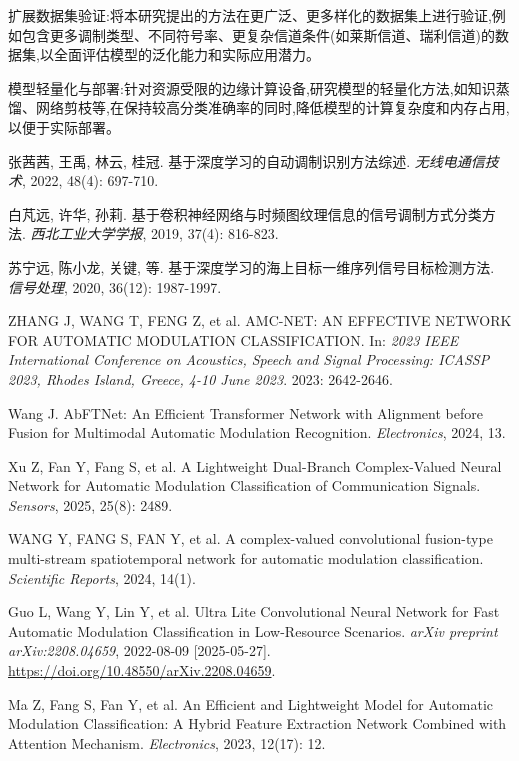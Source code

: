 \documentclass{article}
\begin{document}
\begin{CJK}{UTF8}{gbsn}
扩展数据集验证:将本研究提出的方法在更广泛、更多样化的数据集上进行验证,例如包含更多调制类型、不同符号率、更复杂信道条件(如莱斯信道、瑞利信道)的数据集,以全面评估模型的泛化能力和实际应用潜力。

模型轻量化与部署:针对资源受限的边缘计算设备,研究模型的轻量化方法,如知识蒸馏、网络剪枝等,在保持较高分类准确率的同时,降低模型的计算复杂度和内存占用,以便于实际部署。

\newpage

\begin{thebibliography}{99}

 张茜茜, 王禹, 林云, 桂冠. 基于深度学习的自动调制识别方法综述. \textit{无线电通信技术}, 2022, 48(4): 697-710.

 白芃远, 许华, 孙莉. 基于卷积神经网络与时频图纹理信息的信号调制方式分类方法. \textit{西北工业大学学报}, 2019, 37(4): 816-823.

 苏宁远, 陈小龙, 关键, 等. 基于深度学习的海上目标一维序列信号目标检测方法. \textit{信号处理}, 2020, 36(12): 1987-1997.

 ZHANG J, WANG T, FENG Z, et al. AMC-NET: AN EFFECTIVE NETWORK FOR AUTOMATIC MODULATION CLASSIFICATION. In: \textit{2023 IEEE International Conference on Acoustics, Speech and Signal Processing: ICASSP 2023, Rhodes Island, Greece, 4-10 June 2023}. 2023: 2642-2646.

 Wang J. AbFTNet: An Efficient Transformer Network with Alignment before Fusion for Multimodal Automatic Modulation Recognition. \textit{Electronics}, 2024, 13.

 Xu Z, Fan Y, Fang S, et al. A Lightweight Dual-Branch Complex-Valued Neural Network for Automatic Modulation Classification of Communication Signals. \textit{Sensors}, 2025, 25(8): 2489.

 WANG Y, FANG S, FAN Y, et al. A complex-valued convolutional fusion-type multi-stream spatiotemporal network for automatic modulation classification. \textit{Scientific Reports}, 2024, 14(1).

 Guo L, Wang Y, Lin Y, et al. Ultra Lite Convolutional Neural Network for Fast Automatic Modulation Classification in Low-Resource Scenarios. \textit{arXiv preprint arXiv:2208.04659}, 2022-08-09 [2025-05-27]. \url{https://doi.org/10.48550/arXiv.2208.04659}.

 Ma Z, Fang S, Fan Y, et al. An Efficient and Lightweight Model for Automatic Modulation Classification: A Hybrid Feature Extraction Network Combined with Attention Mechanism. \textit{Electronics}, 2023, 12(17): 12.


\end{thebibliography}
\end{CJK}
\end{document}
